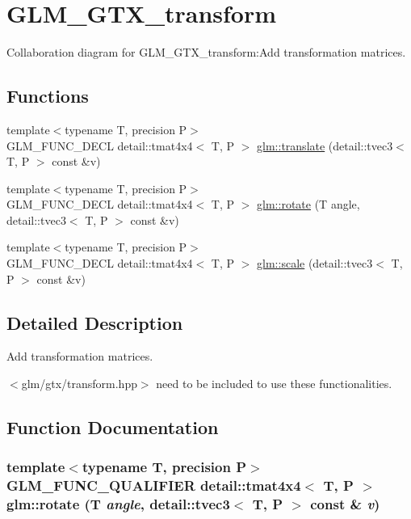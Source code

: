 \hypertarget{group__gtx__transform}{
\section{GLM\_\-GTX\_\-transform}
\label{group__gtx__transform}
}


Collaboration diagram for GLM\_\-GTX\_\-transform:Add transformation matrices.  
\subsection*{Functions}
\begin{CompactItemize}
\item 
{\footnotesize template$<$typename T, precision P$>$ }\\GLM\_\-FUNC\_\-DECL detail::tmat4x4$<$ T, P $>$ \hyperlink{group__gtx__transform_gc06efbcc43ab431cf6ae1ba0e6f03e86}{glm::translate} (detail::tvec3$<$ T, P $>$ const \&v)
\item 
{\footnotesize template$<$typename T, precision P$>$ }\\GLM\_\-FUNC\_\-DECL detail::tmat4x4$<$ T, P $>$ \hyperlink{group__gtx__transform_g52e753e0ad1cb6ae700855cc9ca921ca}{glm::rotate} (T angle, detail::tvec3$<$ T, P $>$ const \&v)
\item 
{\footnotesize template$<$typename T, precision P$>$ }\\GLM\_\-FUNC\_\-DECL detail::tmat4x4$<$ T, P $>$ \hyperlink{group__gtx__transform_g70f2d33f150672b9faca3b477fcca2c4}{glm::scale} (detail::tvec3$<$ T, P $>$ const \&v)
\end{CompactItemize}


\subsection{Detailed Description}
Add transformation matrices. 

$<$glm/gtx/transform.hpp$>$ need to be included to use these functionalities. 

\subsection{Function Documentation}
\hypertarget{group__gtx__transform_g52e753e0ad1cb6ae700855cc9ca921ca}{
\subsubsection[rotate]{\setlength{\rightskip}{0pt plus 5cm}template$<$typename T, precision P$>$ GLM\_\-FUNC\_\-QUALIFIER detail::tmat4x4$<$ T, P $>$ glm::rotate (T {\em angle}, \/  detail::tvec3$<$ T, P $>$ const \& {\em v})}}
\label{group__gtx__transform_g52e753e0ad1cb6ae700855cc9ca921ca}


